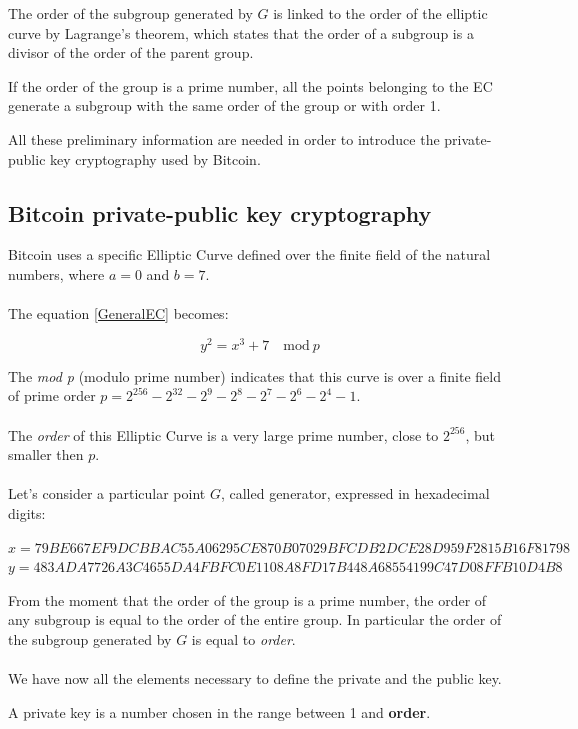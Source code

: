 \begin{remark}
	The order of the subgroup generated by $G$ is linked to the order of the elliptic curve by Lagrange's theorem, which states that the order of a subgroup is a divisor of the order of the parent group.
\end{remark}

\begin{remark}
	If the order of the group is a prime number, all the points belonging to the EC generate a subgroup with the same order of the group or with order 1.
\end{remark}
All these preliminary information are needed in order to introduce the private-public key cryptography used by Bitcoin.





\subsection{Bitcoin private-public key cryptography}

Bitcoin uses a specific Elliptic Curve defined over the finite field of the natural numbers, where $a=0$ and $b=7$. \\ \\
The equation \ref{GeneralEC} becomes:

\begin{equation}\label{BitcoinEC}
y^2=x^3+7 \quad \textrm{mod} \ p
\end{equation}

The \textit{mod p} (modulo prime number) indicates that this curve is over a finite field of prime order $p=2^{256}-2^{32}-2^9-2^8-2^7-2^6-2^4-1$.
\\ \\
The \textit{order} of this Elliptic Curve is a very large prime number, close to $2^{256}$, but smaller then $p$. \\ \\
Let's consider a particular point $G$, called generator, expressed in hexadecimal digits:
\begin{center} 
	$ x=79BE667E F9DCBBAC 55A06295 CE870B07 029BFCDB 2DCE28D9 59F2815B 16F81798$\\
	$y=483ADA77 26A3C465 5DA4FBFC 0E1108A8 FD17B448 A6855419 9C47D08F FB10D4B8$
\end{center}
From the moment that the order of the group is a prime number, the order of any subgroup is equal to the order of the entire group. In particular the order of the subgroup generated by $G$ is equal to \textit{order}.
\\ \\
We have now all the elements necessary to define the private and the public key.
\begin{definition}
	A private key is a number chosen in the range between 1 and \textbf{order}.
\end{definition}

